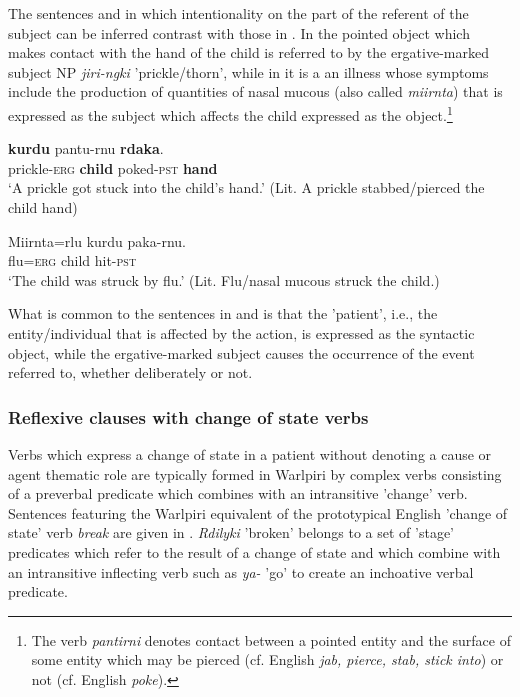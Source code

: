 \documentclass[output=paper]{../langscibook}
\begin{document}
The sentences  and  in which intentionality on the part of the referent of the subject can be inferred contrast with those in . In  the pointed object which makes contact with the hand of the child is referred to by the ergative-marked subject NP \textit{jiri-ngki} 'prickle/thorn', while in  it is a an illness whose symptoms include the production of quantities of nasal mucous (also called \textit{miirnta}) that is expressed as the subject which affects the child expressed as the object.\footnote{The verb \textit{pantirni} denotes contact between a pointed entity and the surface of some entity which may be pierced (cf. English \textit{jab, pierce, stab, stick into}) or not (cf. English \textit{poke}).}

\ea%
    \label{ex:laughren:19}
\ea
\label{ex:laughren:19a}
 \textbf{{kurdu}} {pantu-rnu} \textbf{{rdaka}}.   \\
    prickle-\textsc{erg}  \textbf{child}  poked-\textsc{pst}  \textbf{hand}\\
  \glt `A prickle got stuck into the child's hand.'
    (Lit. A prickle stabbed/pierced the child hand)

\ex
\label{ex:laughren:19b}
\gll  Miirnta=rlu  kurdu  paka-rnu.\\
    flu=\textsc{erg}  child  hit-\textsc{pst}\\
  \glt `The child was struck by flu.'
    (Lit. Flu/nasal mucous struck the child.)
\z
\z

What is common to the sentences in  and  is that the 'patient', i.e., the entity/individual that is affected by the action, is expressed as the syntactic object, while the ergative-marked subject causes the occurrence of the event referred to, whether deliberately or not.

\subsubsection{Reflexive clauses with change of state verbs}\label{sec:laughren:3.2}

Verbs which express a change of state in a patient without denoting a cause or agent thematic role are typically formed in Warlpiri by complex verbs consisting of a preverbal predicate which combines with an intransitive 'change' verb. Sentences featuring the Warlpiri equivalent of the prototypical English 'change of state' verb \textit{break} are given in . \textit{Rdilyki} 'broken' belongs to a set of 'stage' predicates which refer to the result of a change of state and which combine with an intransitive inflecting verb such as \textit{ya-} 'go' to create an inchoative verbal predicate.
\end{document}
